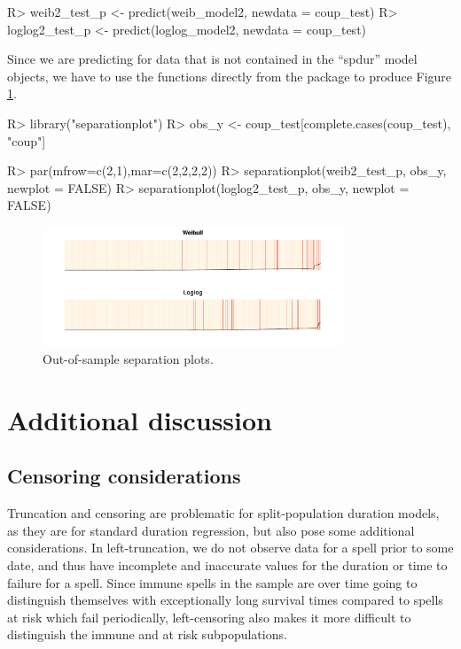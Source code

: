 \documentclass[article]{jss}
\begin{document}
\begin{CodeChunk}
\begin{CodeInput}
R> weib2_test_p   <- predict(weib_model2, newdata = coup_test)
R> loglog2_test_p <- predict(loglog_model2, newdata = coup_test)
\end{CodeInput}
\end{CodeChunk}

Since we are predicting for data that is not contained in the ``spdur''
model objects, we have to use the  functions
directly from the package to produce Figure \ref{oos-sepplots}.

\begin{CodeChunk}
\begin{CodeInput}
R> library("separationplot")
R> obs_y <- coup_test[complete.cases(coup_test), "coup"]

R> par(mfrow=c(2,1),mar=c(2,2,2,2))
R> separationplot(weib2_test_p,   obs_y, newplot = FALSE)
R> separationplot(loglog2_test_p, obs_y, newplot = FALSE)
\end{CodeInput}
\end{CodeChunk}

\begin{figure}
\begin{center}
\includegraphics[width=0.8\textwidth]{graphics/oos-sepplots.pdf}
\caption{Out-of-sample separation plots.}
\label{oos-sepplots}
\end{center}
\end{figure}

\section{Additional discussion}

\subsection{Censoring considerations}

Truncation and censoring are problematic for split-population duration
models, as they are for standard duration regression, but also pose some
additional considerations. In left-truncation, we do not observe data
for a spell prior to some date, and thus have incomplete and inaccurate
values for the duration or time to failure for a spell. Since immune
spells in the sample are over time going to distinguish themselves with
exceptionally long survival times compared to spells at risk which fail
periodically, left-censoring also makes it more difficult to distinguish
the immune and at risk subpopulations.
\end{document}
